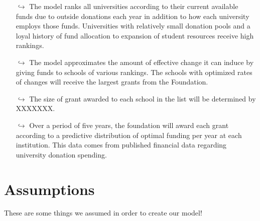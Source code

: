 \documentclass[paper.tex]{subfiles}
\begin{document}
	\begin{itemize} 
		\item[$\hookrightarrow$] The model ranks all universities according to their current available funds due to outside donations each year in addition to how each university employs those funds. Universities with relatively small donation pools and a loyal history of fund allocation to expansion of student resources receive high rankings.
		\item[$\hookrightarrow$] The model approximates the amount of effective change it can induce by giving funds to schools of various rankings. The schools with optimized rates of changes will receive the largest grants from the Foundation.
		\item[$\hookrightarrow$] The size of grant awarded to each school in the list will be determined by XXXXXXX.
		\item[$\hookrightarrow$] Over a period of five years, the foundation will award each grant according to a predictive distribution of optimal funding per year at each institution. This data comes from published financial data regarding university donation spending.
	\end{itemize}
	
	
	\section{Assumptions}
	These are some things we assumed in order to create our model!
\end{document}
